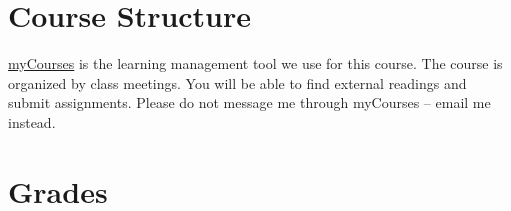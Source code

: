 \documentclass[
  letterpaper,
  DIV=11,
  numbers=noendperiod]{scrreprt}
\begin{document}
\hypertarget{course-structure}{%
\section*{Course Structure}\label{course-structure}}


\href{https://mycourses.unh.edu/courses}{myCourses} is the learning
management tool we use for this course. The course is organized by class
meetings. You will be able to find external readings and submit
assignments. Please do not message me through myCourses -- email me
instead.

\hypertarget{grades}{%
\section*{Grades}\label{grades}}

\end{document}
